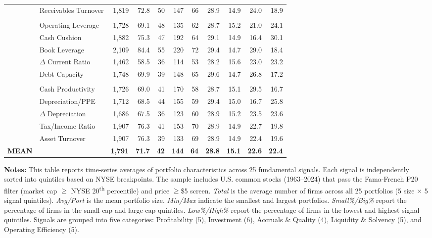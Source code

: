 \begin{table}[htbp]
\begin{adjustbox}{width=0.9\linewidth}
\begin{tabular}{l l*{9}{r}}
 & Receivables Turnover & 1,819 & 72.8 & 50 & 147 & 66 & 28.9 & 14.9 & 24.0 & 18.9 \\
\addlinespace
\multicolumn{11}{l}{\textit{Panel D: Liquidity \& Solvency}} \\
 & Operating Leverage & 1,728 & 69.1 & 48 & 135 & 62 & 28.7 & 15.2 & 21.0 & 24.1 \\
 & Cash Cushion & 1,882 & 75.3 & 47 & 192 & 64 & 29.1 & 14.9 & 16.4 & 30.1 \\
 & Book Leverage & 2,109 & 84.4 & 55 & 220 & 72 & 29.4 & 14.7 & 29.0 & 18.4 \\
 & $\Delta$ Current Ratio & 1,462 & 58.5 & 36 & 114 & 53 & 28.2 & 15.6 & 23.0 & 23.2 \\
 & Debt Capacity & 1,748 & 69.9 & 39 & 148 & 65 & 29.6 & 14.7 & 26.8 & 17.2 \\
\addlinespace
\multicolumn{11}{l}{\textit{Panel E: Operating Efficiency}} \\
 & Cash Productivity & 1,726 & 69.0 & 41 & 170 & 58 & 28.7 & 15.1 & 29.5 & 16.7 \\
 & Depreciation/PPE & 1,712 & 68.5 & 44 & 155 & 59 & 29.4 & 15.0 & 16.7 & 25.8 \\
 & $\Delta$ Depreciation & 1,686 & 67.5 & 36 & 123 & 60 & 28.9 & 15.2 & 23.5 & 23.6 \\
 & Tax/Income Ratio & 1,907 & 76.3 & 41 & 153 & 70 & 28.9 & 14.9 & 22.7 & 19.8 \\
 & Asset Turnover & 1,907 & 76.3 & 39 & 133 & 69 & 28.9 & 14.9 & 22.4 & 19.6 \\
\midrule
\textbf{MEAN} & & \textbf{1,791} & \textbf{71.7} & \textbf{42} & \textbf{144} & \textbf{64} & \textbf{28.8} & \textbf{15.1} & \textbf{22.6} & \textbf{22.4} \\
\bottomrule
\end{tabular}
\end{adjustbox}

\medskip

\begin{minipage}{\textwidth}
\footnotesize
\textbf{Notes:} This table reports time-series averages of portfolio characteristics across 25 fundamental signals. Each signal is independently sorted into quintiles based on NYSE breakpoints. The sample includes U.S. common stocks (1963--2024) that pass the Fama-French P20 filter (market cap $\geq$ NYSE 20\textsuperscript{th} percentile) and price $\geq$\$5 screen. \textit{Total} is the average number of firms across all 25 portfolios (5 size $\times$ 5 signal quintiles). \textit{Avg/Port} is the mean portfolio size. \textit{Min/Max} indicate the smallest and largest portfolios. \textit{Small\%/Big\%} report the percentage of firms in the small-cap and large-cap quintiles. \textit{Low\%/High\%} report the percentage of firms in the lowest and highest signal quintiles. Signals are grouped into five categories: Profitability (5), Investment (6), Accruals \& Quality (4), Liquidity \& Solvency (5), and Operating Efficiency (5).
\end{minipage}

\end{table}
